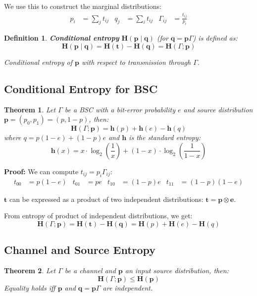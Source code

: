 \documentclass[11pt]{article}
\newtheorem{defn}{Definition}
\newtheorem{theo}{Theorem}
\begin{document}
We use this to construct the marginal distributions:
\begin{align*}
  p_i &= \sum_j t_{ij} & q_j &= \sum_i t_{ij} & \Gamma_{ij} &= \frac{t_{ij}}{p_i}
\end{align*}

\begin{defn}
  \textbf{Conditional entropy} $\textbf{H}(\textbf{p} \mid \textbf{q})$ (for $\textbf{q} = \textbf{p} \Gamma$) is defined as:
  \[
    \textbf{H}(\textbf{p} \mid \textbf{q}) = \textbf{H}(\textbf{t}) -  \textbf{H}(\textbf{q}) = \textbf{H}(\Gamma ; \textbf{p})
  \]

  Conditional entropy of $\textbf{p}$ with respect to transmission through $\Gamma$.
\end{defn}

\subsection{Conditional Entropy for BSC}
\begin{theo}
  Let $\Gamma$ be a BSC with a bit-error probability $e$ and source distribution $\textbf{p} = (p_0, p_1) = (p, 1 - p)$, then:
  \[
    \textbf{H}(\Gamma ; \textbf{p}) = \textbf{h}(p) + \textbf{h}(e) - \textbf{h}(q)
  \]
  where $q = p(1 - e) + (1 - p)e$ and $\textbf{h}$ is the standard entropy:
  \[
    \textbf{h}(x) = x \cdot \log_2 (\frac{1}{x}) + (1 - x) \cdot \log_2 (\frac{1}{1 - x})
  \]
\end{theo}

\textbf{Proof:}
We can compute $t_{ij} = p_i \Gamma_{ij}$:
\begin{align*}
  t_{00} &= p(1 - e) & t_{01} &= pe & t_{10} &= (1 - p)e & t_{11} &= (1 - p)(1 - e)
\end{align*}

$\textbf{t}$ can be expressed as a product of two independent distributions: $\textbf{t} = \textbf{p} \otimes \textbf{e}$.

From entropy of product of independent distributions, we get:
\[
  \textbf{H}(\Gamma ; \textbf{p}) = \textbf{H}(\textbf{t}) -  \textbf{H}(\textbf{q}) = \textbf{H}(p) + \textbf{H}(e) - \textbf{H}(q)
\]

\subsection{Channel and Source Entropy}
\begin{theo}
  Let $\Gamma$ be a channel and $\textbf{p}$ an input source distribution, then:
  \[
     \textbf{H}(\Gamma ; \textbf{p}) \leq \textbf{H}(\textbf{p}) 
  \]
  Equality holds iff $\textbf{p}$ and $\textbf{q} = \textbf{p}\Gamma$ are independent.
\end{theo}
\end{document}
